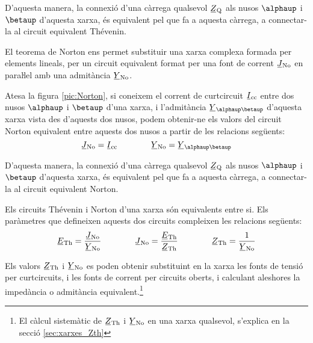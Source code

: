 D'aquesta manera, la connexió d'una càrrega qualsevol $\cmplx{Z}\ped{Q}$ als nusos $\alphaup$ i $\betaup$ d'aquesta xarxa, és
equivalent pel que fa a aquesta càrrega, a connectar-la al circuit
equivalent Thévenin.
\begin{center}
    
    \label{pic:Thevenin}
\end{center}

El teorema de Norton ens permet substituir
una xarxa complexa formada per elements lineals, per un circuit
equivalent format per una font de corrent $\cmplx{J}\ped{No}$ en
paraŀlel amb una admitància $\cmplx{Y}\ped{No}$.

Atesa la figura \vref{pic:Norton}, si coneixem el corrent de
curtcircuit $\cmplx{I}\ped{cc}$ entre dos nusos $\alphaup$ i $\betaup$
d'una xarxa, i l'admitància $\cmplx{Y}_{\alphaup\betaup}$ d'aquesta
xarxa vista des d'aquests dos nusos, podem obtenir-ne els valors del
circuit Norton equivalent entre aquests dos nusos a partir de les
relacions següents:
\begin{equation}
   \cmplx{J}\ped{No} = \cmplx{I}\ped{cc} \qquad\qquad \cmplx{Y}\ped{No} = \cmplx{Y}_{\alphaup\betaup}
\end{equation}

D'aquesta manera, la connexió d'una càrrega qualsevol $\cmplx{Z}\ped{Q}$ als nusos $\alphaup$ i $\betaup$ d'aquesta xarxa, és
equivalent pel que fa a aquesta càrrega, a connectar-la al circuit
equivalent Norton.
\begin{center}
    
    \label{pic:Norton}
\end{center}

Els circuits Thévenin i Norton d'una xarxa són equivalents entre si.
Els paràmetres que defineixen aquests dos circuits compleixen les relacions
següents:
\begin{equation}\label{eq:Thevenin-Norton}
   \cmplx{E}\ped{Th} = \frac{\cmplx{J}\ped{No}}{\cmplx{Y}\ped{No}} \qquad\qquad
   \cmplx{J}\ped{No} = \frac{\cmplx{E}\ped{Th}}{\cmplx{Z}\ped{Th}} \qquad\qquad
    \cmplx{Z}\ped{Th} = \frac{1}{\cmplx{Y}\ped{No}}
\end{equation}

Els valors $\cmplx{Z}\ped{Th}$ i  $\cmplx{Y}\ped{No}$ es poden
obtenir substituint en la xarxa  les fonts de tensió  per curtcircuits, i les fonts de corrent per circuits oberts, i calculant
aleshores la impedància o admitància equivalent.\footnote{El càlcul sistemàtic de $\cmplx{Z}\ped{Th}$ i  $\cmplx{Y}\ped{No}$ en una xarxa qualsevol, s'explica en la secció \ref{sec:xarxes_Zth}}

